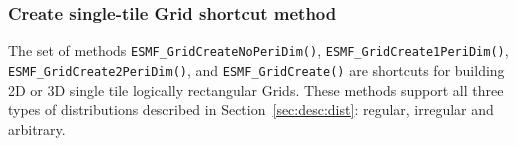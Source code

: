 
\setlength{\oldparskip}{\parskip}
\setlength{\parskip}{1.5ex}
\setlength{\oldparindent}{\parindent}
\setlength{\parindent}{0pt}
\setlength{\oldbaselineskip}{\baselineskip}
\setlength{\baselineskip}{11pt}
 
\def\bv{\begin{verbatim}}
\def\ev{\end{verbatim}}
\def\be{\begin{equation}}
\def\ee{\end{equation}}
\def\bea{\begin{eqnarray}}
\def\eea{\end{eqnarray}}
\def\bi{\begin{itemize}}
\def\ei{\end{itemize}}
\def\bn{\begin{enumerate}}
\def\en{\end{enumerate}}
\def\bd{\begin{description}}
\def\ed{\end{description}}
\def\({\left (}
\def\){\right )}
\def\[{\left [}
\def\]{\right ]}
\def\<{\left  \langle}
\def\>{\right \rangle}
\def\cI{{\cal I}}
\def\diag{\mathop{\rm diag}}
\def\tr{\mathop{\rm tr}}


 

  
  \subsubsection{Create single-tile Grid shortcut method}
 
   The set of methods {\tt ESMF\_GridCreateNoPeriDim()}, {\tt ESMF\_GridCreate1PeriDim()},
   {\tt ESMF\_GridCreate2PeriDim()}, and {\tt ESMF\_GridCreate()} are shortcuts
   for building 2D or 3D single tile logically rectangular Grids.
   These methods support all three types of distributions described in
   Section~\ref{sec:desc:dist}: regular, irregular and arbitrary.
  
